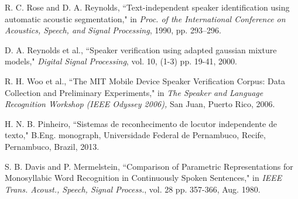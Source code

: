\documentclass[a4paper,twocolumn]{article}
\begin{document}
\begin{thebibliography}{9}
        R. C. Rose and D. A. Reynolds,
        ``Text-independent speaker identification using automatic acoustic segmentation,"
        in \textit{Proc. of the International Conference on Acoustics, Speech, and
        Signal Processing},
        1990,
        pp. 293–296.

        D. A. Reynolds et al.,
        ``Speaker verification using adapted gaussian mixture models,"
        \textit{Digital Signal Processing}, vol. 10,
        (1-3) pp. 19-41,
        2000.

        R. H. Woo et al.,
        ``The MIT Mobile Device Speaker Verification Corpus: Data Collection and Preliminary Experiments,"
        in \textit{The Speaker and Language Recognition Workshop (IEEE Odyssey 2006),}
        San Juan, Puerto Rico, 2006.

        H. N. B. Pinheiro,
        ``Sistemas de reconhecimento de locutor independente de texto,"
        B.Eng. monograph, Universidade Federal de Pernambuco,
        Recife, Pernambuco, Brazil,
        2013.

        S. B. Davis and P. Mermelstein,
        ``Comparison of Parametric Representations for Monosyllabic Word Recognition in Continuously Spoken Sentences,"
        in \textit{IEEE Trans. Acoust., Speech, Signal Process.},
        vol. 28
        pp. 357-366,
        Aug. 1980.

\end{thebibliography}
\end{document}
